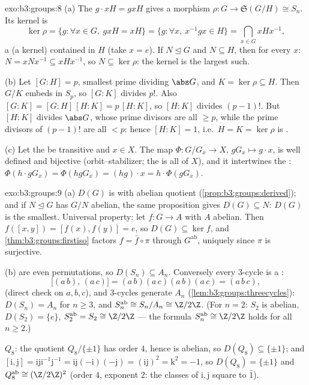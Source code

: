 \begin{solution}{exo:b3:groups:8}
(a) The  $g \cdot xH = gxH$ gives a morphism $\rho \colon G
\to \mathfrak S(G/H) \cong S_n$. Its kernel is
\[
\ker\rho = \{g : \forall x \in G,\ gxH = xH\}
= \{g : \forall x,\ x^{-1}gx \in H\}
= \bigcap_{x \in G} xHx^{-1},
\]
a  (a kernel) contained in $H$ (take $x = e$). If
$N \trianglelefteq G$ and $N \subseteq H$, then for every $x$: $N
= xNx^{-1} \subseteq xHx^{-1}$, so $N \subseteq \ker\rho$: the
kernel is the largest such.

(b) Let $[G:H] = p$, smallest prime dividing $\abs G$, and $K =
\ker\rho \subseteq H$. Then $G/K$ embeds in $S_p$, so $[G:K]$
divides $p!$. Also $[G:K] = [G:H]\,[H:K] = p\,[H:K]$, so $[H:K]$
divides $(p-1)!$. But $[H:K]$ divides $\abs G$, whose prime
divisors are all $\geq p$, while the prime divisors of $(p-1)!$
are all $< p$: hence $[H:K] = 1$, i.e.\ $H = K = \ker \rho$ is
.

(c) Let the  be transitive and $x \in X$. The map $\Phi
\colon G/G_x \to X$, $gG_x \mapsto g \cdot x$, is well defined and
bijective (orbit--stabilizer; the  is all of $X$), and it
intertwines the : $\Phi(h \cdot gG_x) = \Phi(hgG_x) = (hg)
\cdot x = h \cdot \Phi(gG_x)$.
\end{solution}

\begin{solution}{exo:b3:groups:9}
(a) $D(G)$ is  with abelian quotient
(\cref{prop:b3:groups:derived}); and if $N \trianglelefteq G$ has
$G/N$ abelian, the same proposition gives $D(G) \subseteq N$:
$D(G)$ is the smallest. Universal property: let $f \colon G \to A$
with $A$ abelian. Then $f([x,y]) = [f(x), f(y)] = e$, so $D(G)
\subseteq \ker f$, and \cref{thm:b3:groups:firstiso} factors $f =
\bar f \circ \pi$ through $G^{\mathrm{ab}}$, uniquely since $\pi$
is surjective.

(b)  are even permutations, so $D(S_n) \subseteq A_n$.
Conversely every $3$-cycle is a :
\[
\bigl[(a\,b),\,(a\,c)\bigr] = (a\,b)(a\,c)(a\,b)(a\,c) =
(a\,b\,c),
\]
(direct check on $a, b, c$), and $3$-cycles generate $A_n$
(\cref{lem:b3:groups:threecycles}): $D(S_n) = A_n$ for $n \geq 3$,
and $S_n^{\mathrm{ab}} \cong S_n/A_n \cong \Z/2\Z$. (For $n = 2$:
$S_2$ is abelian, $D(S_2) = \{e\}$, $S_2^{\mathrm{ab}} = S_2
\cong \Z/2\Z$ --- the formula $S_n^{\mathrm{ab}} \cong \Z/2\Z$
holds for all $n \geq 2$.)

$Q_8$: the quotient $Q_8/\{\pm 1\}$ has order $4$, hence is
abelian, so $D(Q_8) \subseteq \{\pm 1\}$; and $[\mathrm i, \mathrm
j] = \mathrm i \mathrm j \mathrm i^{-1}\mathrm j^{-1} = \mathrm
i\mathrm j(-\mathrm i)(-\mathrm j) = (\mathrm i \mathrm j)^2 =
\mathrm k^2 = -1$, so $D(Q_8) = \{\pm 1\}$ and
$Q_8^{\mathrm{ab}} \cong (\Z/2\Z)^2$ (order $4$, exponent $2$:
the classes of $\mathrm i, \mathrm j$ square to $\bar 1$).
\end{solution}

